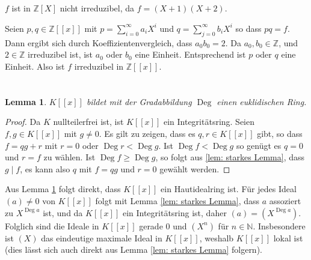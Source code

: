\documentclass[a4paper,10pt]{article}
\newcounter{satze}
\newtheorem{lem}[satze]{Lemma}
\newcommand{\N}{\mathbb{N}}
\newcommand{\Z}{\mathbb{Z}}
\newcommand{\Deg}{\operatorname{Deg}}
\begin{document}
\subsection{}
$f$ ist in $\Z[X]$ nicht irreduzibel, da $f = (X+1)(X+2)$.

Seien $p,q \in \Z[\![x]\!]$ mit $p = \sum_{i=0}^\infty a_i X^i$ und $q = \sum_{j=0}^\infty b_i X^i$ so dass $pq = f$. Dann ergibt sich durch Koeffizientenvergleich, dass $a_0 b_0 = 2$. Da $a_0, b_0 \in \Z$, und $2 \in \Z$ irreduzibel ist, ist $a_0$ oder $b_0$ eine Einheit. Entsprechend ist $p$ oder $q$ eine Einheit. Also ist $f$ irreduzibel in $\Z[\![x]\!]$.





\section{}
\begin{lem}\label{lem: K[[x]] euklidisch}
 $K[\![x]\!]$ bildet mit der Gradabbildung $\Deg$ einen euklidischen Ring.
\end{lem}
\begin{proof}
 Da $K$ nullteilerfrei ist, ist $K[\![x]\!]$ ein Integritätsring. Seien $f,g \in K[\![x]\!]$ mit $g \neq 0$. Es gilt zu zeigen, dass es $q,r \in K[\![x]\!]$ gibt, so dass $f = qg + r$ mit $r = 0$ oder $\Deg r < \Deg g$. Ist $\Deg f < \Deg g$ so genügt es $q=0$ und $r=f$ zu wählen. Ist $\Deg f \geq \Deg g$, so folgt aus \ref{lem: starkes Lemma}, dass $g \mid f$, es kann also $q$ mit $f = qg$ und $r=0$ gewählt werden.
\end{proof}

Aus Lemma \ref{lem: K[[x]] euklidisch} folgt direkt, dass $K[\![x]\!]$ ein Hautidealring ist. Für jedes Ideal $(a) \neq 0$ von $K[\![x]\!]$ folgt mit Lemma \ref{lem: starkes Lemma}, dass $a$ assoziert zu $X^{\Deg a}$ ist, und da $K[\![x]\!]$ ein Integritätsring ist, daher $(a) = \left(X^{\Deg a}\right)$. Folglich sind die Ideale in $K[\![x]\!]$ gerade $0$ und $\left(X^n\right)$ für $n \in \N$. Insbesondere ist $(X)$ das eindeutige maximale Ideal in $K[\![x]\!]$, weshalb $K[\![x]\!]$ lokal ist (dies lässt sich auch direkt aus Lemma \ref{lem: starkes Lemma} folgern).
\end{document}
